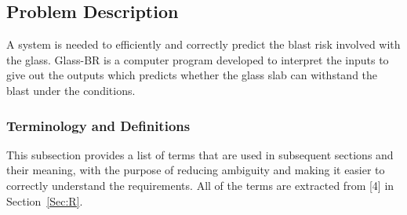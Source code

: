\documentclass[12pt]{article}
\begin{document}
\subsection{Problem Description}
\label{Sec:PD}
A system is needed to efficiently and correctly predict the blast risk involved with the glass. Glass-BR is a computer program developed to interpret the inputs to give out the outputs which predicts whether the glass slab can withstand the blast under the conditions.
\subsubsection{Terminology and Definitions}
\label{Sec:TaD}
This subsection provides a list of terms that are used in subsequent sections and their meaning, with the purpose of reducing ambiguity and making it easier to correctly understand the requirements. All of the terms are extracted from [4] in Section~\ref{Sec:R}.
\end{document}
